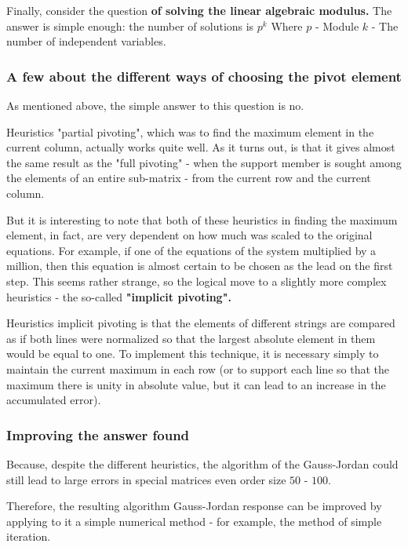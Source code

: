 Finally, consider the question \textbf{of solving the linear algebraic modulus.} The answer is simple enough: the number of solutions is $p ^ k$ Where $p$ - Module $k$ - The number of independent variables.

\subsubsection{ A few about the different ways of choosing the pivot element }

As mentioned above, the simple answer to this question is no.

Heuristics "partial pivoting", which was to find the maximum element in the current column, actually works quite well. As it turns out, is that it gives almost the same result as the "full pivoting" - when the support member is sought among the elements of an entire sub-matrix - from the current row and the current column.

But it is interesting to note that both of these heuristics in finding the maximum element, in fact, are very dependent on how much was scaled to the original equations. For example, if one of the equations of the system multiplied by a million, then this equation is almost certain to be chosen as the lead on the first step. This seems rather strange, so the logical move to a slightly more complex heuristics - the so-called \textbf{"implicit pivoting".}

Heuristics implicit pivoting is that the elements of different strings are compared as if both lines were normalized so that the largest absolute element in them would be equal to one. To implement this technique, it is necessary simply to maintain the current maximum in each row (or to support each line so that the maximum there is unity in absolute value, but it can lead to an increase in the accumulated error).

\subsubsection{ Improving the answer found }

Because, despite the different heuristics, the algorithm of the Gauss-Jordan could still lead to large errors in special matrices even order size $50$ - $100$.

Therefore, the resulting algorithm Gauss-Jordan response can be improved by applying to it a simple numerical method - for example, the method of simple iteration.

